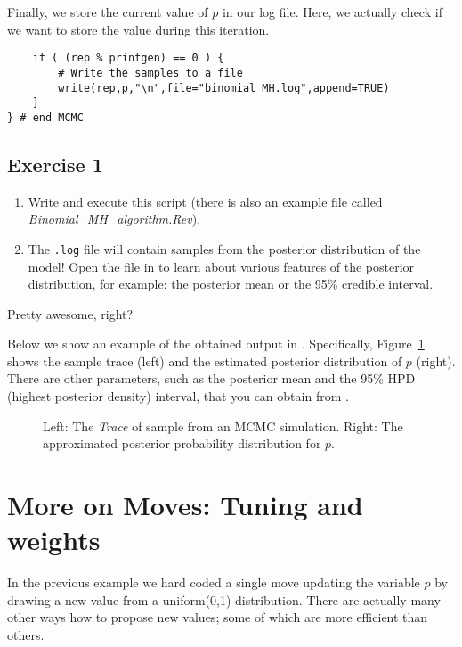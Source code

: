 Finally, we store the current value of $p$ in our log file.
Here, we actually check if we want to store the value during this iteration.
{\tt \begin{snugshade*}
\begin{lstlisting}
    if ( (rep % printgen) == 0 ) {
        # Write the samples to a file
        write(rep,p,"\n",file="binomial_MH.log",append=TRUE)
    }
} # end MCMC\end{lstlisting}
\end{snugshade*}}


\subsection{Exercise 1}

\begin{enumerate}[label=\textnormal{Step \arabic*)}]
	\item Write and execute this script (there is also an example file called \emph{Binomial\_MH\_algorithm.Rev}).
	\item The \texttt{.log} file will contain samples from the posterior distribution of the model! Open the file in \Tracer to learn about various features of the posterior distribution, for example: the posterior mean or the 95\% credible interval.
\end{enumerate}
Pretty awesome, right?

Below we show an example of the obtained output in \Tracer.
Specifically, Figure~\ref{fig:mcmc_samples} shows the sample trace (left) and the estimated posterior distribution of $p$ (right).
There are other parameters, such as the posterior mean and the 95\% HPD (highest posterior density) interval, that you can obtain from \Tracer.
\begin{figure}[h!]
\centering
{}
\label{fig:mcmc_samples}
\caption{Left: The \emph{Trace} of sample from an MCMC simulation. Right: The approximated posterior probability distribution for $p$.}
\end{figure}

\section{More on Moves: Tuning and weights}

In the previous example we hard coded a single move updating the variable $p$ by drawing a new value from a uniform(0,1) distribution.
There are actually many other ways how to propose new values; some of which are more efficient than others.

